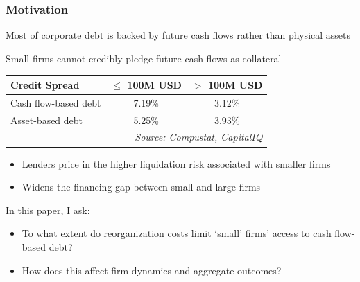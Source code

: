 \documentclass[aspectratio=169,xcolor=table]{beamer}
\begin{document}
\begin{frame}[label=motivation2] \frametitle{Motivation \hfill \hyperlink{LandM}{}}

Most of corporate debt is backed by future cash flows rather than physical assets 

Small firms cannot credibly pledge future cash flows as collateral \vspace{-1mm}
\footnotesize
\begin{table}[h]
    \centering
    \renewcommand{\arraystretch}{1}
    \begin{tabular}{lcc}
        \textbf{Credit Spread} & \textbf{$\leq$ 100M USD} & \textbf{$>$ 100M USD} \\
        \midrule
        Cash flow-based debt & 7.19\% & 3.12\% \\
        Asset-based debt     & 5.25\% & 3.93\% \\
        \bottomrule
        & \multicolumn{2}{r}{\textit{\scriptsize Source: Compustat, CapitalIQ}} \\
    \end{tabular}
\end{table} \vspace{-1mm}
\normalsize 

\begin{itemize} \normalsize
    \item Lenders price in the higher liquidation risk associated with smaller firms
    \item Widens the financing gap between small and large firms
\end{itemize} \vspace{1mm}

\pause

In this paper, I ask:
\begin{itemize} \small
    \item[1.] To what extent do reorganization costs limit `small' firms' access to cash flow-based debt?
    \item[2.] How does this affect firm dynamics and aggregate outcomes?
\end{itemize}

\end{frame}
\end{document}
